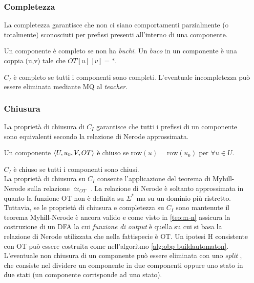 \subsubsection{Completezza}
La completezza garantisce che non ci siano comportamenti parzialmente (o totalmente) sconosciuti per prefissi presenti all'interno di una componente.
\begin{definizione*} Un componente è completo se non ha \textit{buchi}. Un \textit{buco} in un componente è una coppia (u,v) tale che $OT[u][v] = *$.
\end{definizione*}
$C_I$ è completo se tutti i componenti sono completi.
L'eventuale incompletezza può essere eliminata mediante \ac{MQ} al \textit{teacher}.
\subsubsection{Chiusura}
La proprietà di chiusura di $C_I$ garantisce che tutti i prefissi di un componente sono equivalenti secondo la relazione di Nerode approssimata.

\begin{definizione*} Un componente $\Braket{U,u_0,V,OT}$ è chiuso se $\text{row}(u) = \text{row}(u_0) \text{ per } \forall u \in U$.
\end{definizione*}
$C_I$ è chiuso se tutti i componenti sono chiusi.\\

La proprietà di chiusura su $C_I$ consente l'applicazione del teorema di Myhill-Nerode sulla relazione $\simeq_{OT}$ . La relazione di Nerode è soltanto approssimata in quanto la funzione OT non è definita su $\Sigma^{*}$ ma su un dominio più ristretto. Tuttavia, se le proprietà di chiusura  e completezza  su $C_I$ sono mantenute il teorema Myhill-Nerode è ancora valido e come visto in \ref{teo:m-n} assicura la costruzione di un \ac{DFA} la cui \textit{funzione di output} è quella su cui si basa la relazione di Nerode utilizzata che nella fattispecie è OT. Un ipotesi \ac{H} consistente con OT può essere costruita come nell'algoritmo \ref{alg:obp-buildautomaton}. L'eventuale non chiusura di un componente può essere eliminata con uno \textit{split} , che consiste nel dividere un componente in due componenti oppure uno stato in due stati (un componente corrisponde ad uno stato).

